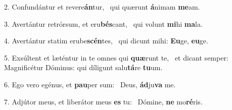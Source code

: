 2. Confundántur et revere\textbf{án}tur, \ast\  qui quærunt \textbf{á}nimam \textbf{me}am.\

3. Avertántur retrórsum, et eru\textbf{bés}cant, \ast\  qui volunt \textbf{mi}hi \textbf{ma}la.\

4. Avertántur statim erube\textbf{scén}tes, \ast\  qui dicunt mihi: \textbf{Eu}ge, \textbf{eu}ge.\

5. Exsúltent et læténtur in te omnes qui \textbf{quæ}runt te, \ast\  et dicant semper: Magnificétur Dóminus: qui díligunt salu\textbf{tá}re \textbf{tu}um.\

6. Ego vero egénus, et \textbf{pau}per sum: \ast\  Deus, \textbf{ád}ju\textbf{va} me.\

7. Adjútor meus, et liberátor meus \textbf{es} tu: \ast\  Dómine, \textbf{ne} mo\textbf{ré}ris.\

